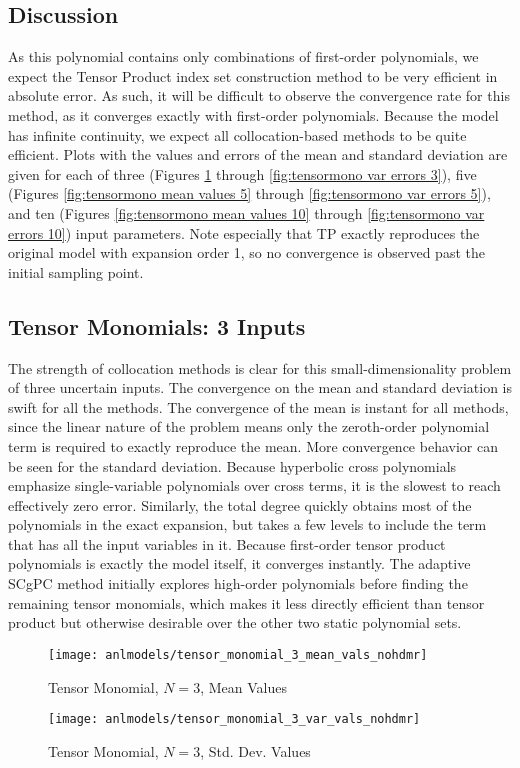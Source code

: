 \subsection{Discussion}
As this polynomial contains only combinations of
first-order polynomials, we expect the Tensor Product index set construction method to be very efficient
in absolute error.  
As such, it will be difficult to observe the convergence rate for this method, as it converges exactly with 
first-order polynomials.
Because the model has infinite continuity, we expect all collocation-based
methods to be quite efficient.  Plots with the values and errors of the mean and standard deviation are given
for each of three (Figures \ref{fig:tensormono mean values 3} through \ref{fig:tensormono var errors 3}),
five (Figures \ref{fig:tensormono mean values 5} through \ref{fig:tensormono var errors 5}), 
and ten (Figures \ref{fig:tensormono mean values 10} through \ref{fig:tensormono var errors 10})
input parameters.  Note especially that TP exactly reproduces the original model with expansion order 1, so no convergence is
observed past the initial sampling point.

\subsection{Tensor Monomials: 3 Inputs}
The strength of collocation methods is clear for this small-dimensionality problem of three uncertain inputs.
The convergence on the
mean and standard deviation is swift for all the methods.  The convergence of the mean is instant for all methods, since
the linear nature of the problem means only the zeroth-order polynomial term is required to exactly reproduce the mean.
More convergence behavior can be seen for the standard deviation.
Because hyperbolic cross polynomials emphasize single-variable polynomials over cross terms, it is the slowest to reach
effectively zero error.  Similarly, the total degree quickly obtains most of the polynomials in the exact expansion,
but takes a few levels to include the term that has all the input variables in it.  Because first-order tensor product
polynomials is exactly the model itself, it converges instantly.
The adaptive SCgPC method initially explores high-order polynomials before finding the remaining tensor
monomials, which makes it less directly efficient than tensor product but otherwise desirable over the other
two static polynomial sets.
\begin{figure}[H]
  \centering
  \texttt{[image: anlmodels/tensor\_monomial\_3\_mean\_vals\_nohdmr]}
  \caption{Tensor Monomial, $N=3$, Mean Values}
  \label{fig:tensormono mean values 3}
\end{figure}
\begin{figure}[H]
  \centering
  \texttt{[image: anlmodels/tensor\_monomial\_3\_var\_vals\_nohdmr]}
  \caption{Tensor Monomial, $N=3$, Std. Dev. Values}
  \label{fig:tensormono var values 3}
\end{figure}

